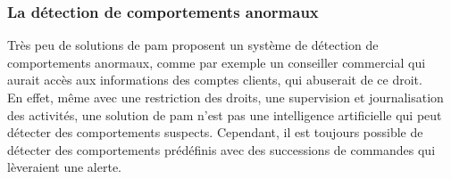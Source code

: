 \subsubsection{La détection de comportements anormaux}
Très peu de solutions de \gls{pam} proposent un système de détection de comportements anormaux, comme par exemple un conseiller commercial qui aurait accès aux informations des comptes clients, qui abuserait de ce droit.\\
En effet, même avec une restriction des droits, une supervision et journalisation des activités, une solution de \gls{pam} n'est pas une intelligence artificielle qui peut détecter des comportements suspects. Cependant, il est toujours possible de détecter des comportements prédéfinis avec des successions de commandes qui lèveraient une alerte.

